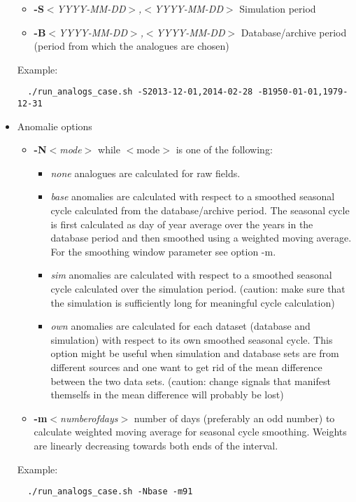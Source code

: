 \documentclass[11p,a4paper]{article}
\begin{document}
\begin{itemize}
 \begin{itemize}
  \item \textbf{-S}\textit{$<$YYYY-MM-DD$>$,$<$YYYY-MM-DD$>$} Simulation period
  \item \textbf{-B}\textit{$<$YYYY-MM-DD$>$,$<$YYYY-MM-DD$>$} Database/archive period (period from which the analogues are chosen)
 \end{itemize}  
 Example:
 \begin{verbatim}
  ./run_analogs_case.sh -S2013-12-01,2014-02-28 -B1950-01-01,1979-12-31
 \end{verbatim}
 \item Anomalie options
 \begin{itemize}
  \item \textbf{-N}\textit{$<$mode$>$} while $<$mode$>$ is one of the following:
  \begin{itemize}
   \item \textit{none}  analogues are calculated for raw fields.
   \item \textit{base}  anomalies are calculated with respect to a smoothed seasonal cycle calculated from the database/archive period. The seasonal cycle is first calculated as day of year average over the years in the database period and then smoothed using a weighted moving average. For the smoothing window parameter see option -m. 
   \item \textit{sim} anomalies are calculated with respect to a smoothed seasonal cycle calculated over the simulation period. (caution: make sure that the simulation is sufficiently long for meaningful cycle calculation)
   \item \textit{own} anomalies are calculated for each dataset (database and simulation) with respect to its own smoothed seasonal cycle. This option might be useful when simulation and database sets are from different sources and one want to get rid of the mean difference between the two data sets. (caution: change signals that manifest themselfs in the mean difference will probably be lost)
  \end{itemize}  
  \item \textbf{-m}\textit{$<$numberofdays$>$} number of days (preferably an odd number) to calculate weighted moving average for seasonal cycle smoothing. Weights are linearly decreasing towards  both ends of the interval.
 \end{itemize}
 Example:
 \begin{verbatim}
  ./run_analogs_case.sh -Nbase -m91
 \end{verbatim}

\end{itemize}
\end{document}
